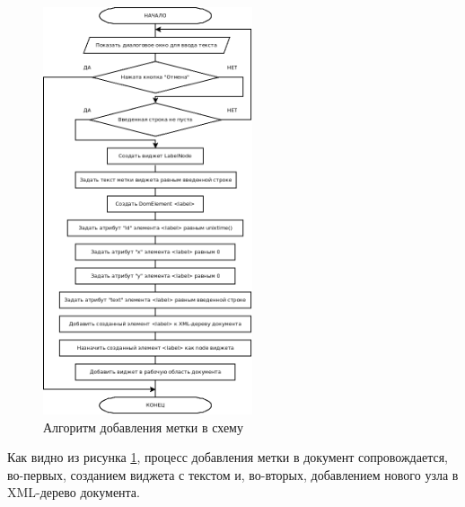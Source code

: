 \begin{figure}[H]
  \centering
  \includegraphics[width=0.55\textwidth]{diagrams/block-schemes/add-label.png}
  \caption{Алгоритм добавления метки в схему}
  \label{fig:new-label}
\end{figure}

Как видно из рисунка \ref{fig:new-label}, процесс добавления метки в документ сопровождается, во-первых, созданием виджета с текстом и, во-вторых, добавлением нового узла в XML-дерево документа.

